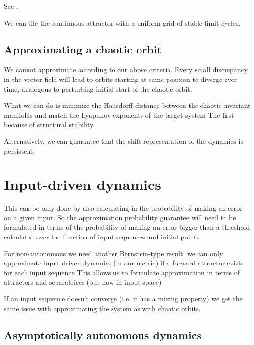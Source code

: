 \documentclass{article}
\theoremstyle{definition}
\theoremstyle{remark}
\newcounter{ct}
\begin{document}
See \citep{Sagodi2024a}.


We can tile the continuous attractor with a uniform grid of stable limit cycles.




\subsection{Approximating a chaotic orbit}
We cannot approximate according to our above criteria.
Every small discrepancy in the vector field will lead to orbits starting at same position to diverge over time, analogous to perturbing initial start of the chaotic orbit.


What we can do is minimize the Hausdorff distance between the chaotic invariant manifolds and match the Lyapunov exponents of the target system
The first because of structural stability.


Alternatively, we can guarantee that the shift representation of the dynamics is persistent.

\section{Input-driven dynamics}

This can be only done by also calculating in the probability of making an error on a given input.
So the approximation probability guarantee will need to be formulated in terms of the probability of making an error bigger than a threshold calculated over the function of input sequences and initial points.

For non-autonomous we need another Bernstein-type result:
we can only approximate input driven dynamics (in our metric) if a forward attractor exists for each input sequence 
This allows us to formulate approximation in terms of attractors and separatrices (but now in input space)

If an input sequence doesn't converge (i.e. it has a mixing property) we get the same issue with approximating the system as with chaotic orbits.



\subsection{Asymptotically autonomous dynamics}
\end{document}
